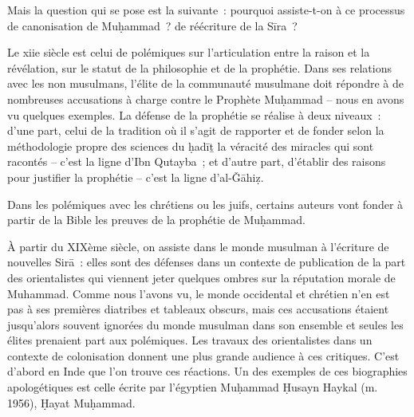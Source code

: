 Mais la question qui se pose est la suivante~: pourquoi assiste-t-on à
ce processus de canonisation de Muḥammad~? de réécriture de la Sīra~?

Le xiie siècle est celui de polémiques sur l'articulation entre la
raison et la révélation, sur le statut de la philosophie et de la
prophétie. Dans ses relations avec les non musulmans, l'élite de la
communauté musulmane doit répondre à de nombreuses accusations à charge
contre le Prophète Muḥammad -- nous en avons vu quelques exemples. La
défense de la prophétie se réalise à deux niveaux~: d'une part, celui de
la tradition où il s'agit de rapporter et de fonder selon la
méthodologie propre des sciences du ḥadīṯ la véracité des miracles qui
sont racontés -- c'est la ligne d'Ibn Qutayba~; et d'autre part,
d'établir des raisons pour justifier la prophétie -- c'est la ligne
d'al-Ǧāhiẓ.

Dans les polémiques avec les chrétiens ou les juifs, certains auteurs
vont fonder à partir de la Bible les preuves de la prophétie de
Muḥammad.


À partir du XIXème siècle, on assiste dans le monde musulman à
l'écriture de nouvelles Sirā~: elles sont des défenses dans un contexte
de publication de la part des orientalistes qui viennent jeter quelques
ombres sur la réputation morale de Muhammad. Comme nous l'avons vu, le
monde occidental et chrétien n'en est pas à ses premières diatribes et
tableaux obscurs, mais ces accusations étaient jusqu'alors souvent
ignorées du monde musulman dans son ensemble et seules les élites
prenaient part aux polémiques. Les travaux des orientalistes dans un
contexte de colonisation donnent une plus grande audience à ces
critiques. C'est d'abord en Inde que l'on trouve ces réactions. Un des
exemples de ces biographies apologétiques est celle écrite par
l'égyptien Muḥammad Ḥusayn Haykal (m. 1956), Ḥayat Muḥammad.

